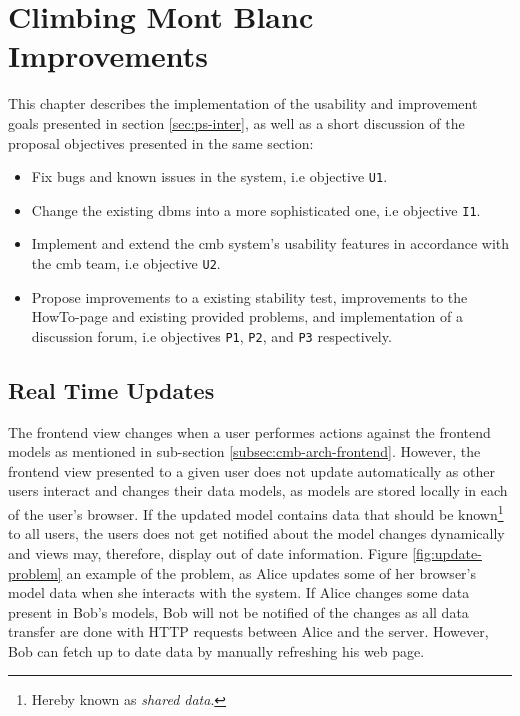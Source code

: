 \chapter{Climbing Mont Blanc Improvements}
\label{ch:improvements}
This chapter describes the implementation of the usability and improvement goals presented in section \ref{sec:ps-inter}, as well as a short discussion of the proposal objectives presented in the same section:
\begin{itemize}
    \item Fix bugs and known issues in the system, i.e objective \texttt{U1}.
    \item Change the existing \gls{dbms} into a more sophisticated one, i.e objective \texttt{I1}.
    \item Implement and extend the \gls{cmb} system's usability features in accordance with the \gls{cmb} team, i.e objective \texttt{U2}.
    \item Propose improvements to a existing stability test, improvements to the HowTo-page and existing provided problems, and implementation of a discussion forum, i.e objectives \texttt{P1}, \texttt{P2}, and \texttt{P3} respectively.
\end{itemize}

\section{Real Time Updates}
\label{sec:real-time}
The frontend view changes when a user performes actions against the frontend models as mentioned in sub-section \ref{subsec:cmb-arch-frontend}. However, the frontend view presented to a given user does not update automatically as other users interact and changes their data models, as models are stored locally in each of the user’s browser. If the updated model contains data that should be known\footnote{Hereby known as \textit{shared data}.} to all users, the users does not get notified about the model changes dynamically and views may, therefore, display out of date information. Figure \ref{fig:update-problem} an example of the problem, as Alice updates some of her browser’s model data when she interacts with the system. If Alice changes some data present in Bob’s models, Bob will not be notified of the changes as all data transfer are done with HTTP requests between Alice and the server. However, Bob can fetch up to date data by manually refreshing his web page. \\

